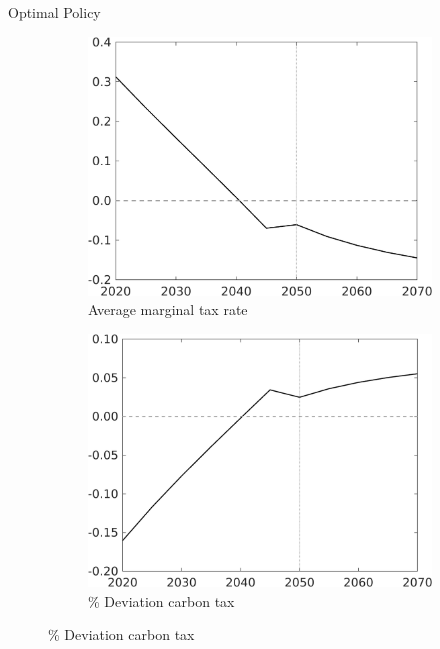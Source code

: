 \documentclass[11pt,aspectratio=169]{beamer}
\begin{document}
\begin{frame}{Optimal Policy}
	\begin{figure}[h!!]
		
		\begin{subfigure}{0.32\textwidth}		
			\caption{Average marginal tax rate}
			\includegraphics[width=1\textwidth]{../codding_model/own_basedOnFried/optimalPol_010922_revision/figures/all_13Sept22_Tplus30/dTaulAv_OPT_T_NoTaus_COMPtaul_regime4_spillover0_knspil0_noskill0_sep0_xgrowth0_PV1_etaa0.79_lgd0.png}
		\end{subfigure}
		\begin{subfigure}{0.32\textwidth}
		\caption{\normalsize{\% Deviation carbon tax}}
		\includegraphics[width=1\textwidth]{../codding_model/own_basedOnFried/optimalPol_010922_revision/figures/all_13Sept22_Tplus30/Tauf_OPT_T_NoTaus_COMPtaulPer_regime4_spillover0_knspil0_noskill0_sep0_xgrowth0_PV1_etaa0.79.png}

\end{subfigure}
\end{figure}
\end{frame}
\end{document}
